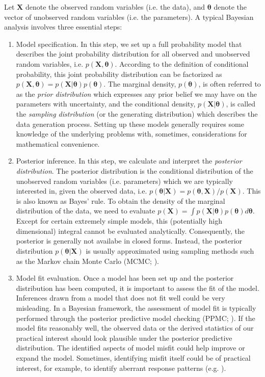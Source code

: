 \documentclass[floatsintext, man]{apa7}
\begin{document}
Let $\bm{X}$ denote the observed random variables (i.e. the data), and $
\bm{\theta}$ denote the vector of unobserved random variables (i.e. the
parameters). A typical Bayesian analysis involves three essential steps:
\begin{enumerate}
  \item Model specification. In this step, we set up a full probability model
  that describes the joint probability distribution for all observed and
  unobserved random variables, i.e. $p(\bm{X}, \bm{\theta})$. According to the
  definition of conditional probability, this joint probability distribution can
  be factorized as $p(\bm{X}, \bm{\theta}) = p(\bm{X}|\bm{\theta})p(
  \bm{\theta})$. The marginal density, $p(\bm{\theta})$, is often referred to as
  the \textit{prior distribution} which expresses any prior belief we may have
  on the parameters with uncertainty, and the conditional density, $p(\bm{X}|
  \bm{\theta})$, is called the \textit{sampling distribution} (or the generating
  distribution) which describes the data generation process. Setting up these
  models generally requires some knowledge of the underlying problems with,
  sometimes, considerations for mathematical convenience.

  \item Posterior inference. In this step, we calculate and interpret the
  \textit{posterior distribution}. The posterior distribution is the conditional
  distribution of the unobserved random variables (i.e. parameters) which we are
  typically interested in, given the observed data, i.e. $p(\bm{\theta}|\bm{X})
  = p(\bm{\theta}, \bm{X}) / p(\bm{X})$. This is also known as Bayes' rule. To
  obtain the density of the marginal distribution of the data, we need to
  evaluate $p(\bm{X}) = \int p(\bm{X}|\bm{\theta})p(\bm{\theta}) d\bm{\theta}$.
  Except for certain extremely simple models, this (potentially high
  dimensional) integral cannot be evaluated analytically. Consequently, the
  posterior is generally not availabe in closed forms. Instead, the posterior
  distribution $p(\bm{\theta}|\bm{X})$ is usually approximated using sampling
  methods such as the Markov chain Monte Carlo (MCMC; 
  \cite{neal_probabilistic_1998,gelman_bayesian_2013}).

  \item Model fit evaluation. Once a model has been set up and the posterior
  distribution has been computed, it is important to assess the fit of the
  model. Inferences drawn from a model that does not fit well could be very
  misleading. In a Bayesian framework, the assessment of model fit is typically
  performed through the posterior predictive model checking (PPMC; 
  \cite{gelman_bayesian_2013,rubin_bayesianly_1984}). If the model fits
  reasonably well, the observed data or
  the derived statistics of our practical interest should look plausible under
  the posterior predictive distribution. The identified aspects of model misfit
  could help improve or expand the model. Sometimes, identifying misfit itself
  could be of practical interest, for example, to identify aberrant response
  patterns (e.g. \cite{sinharay_assessment_2015}).
\end{enumerate}
\end{document}
